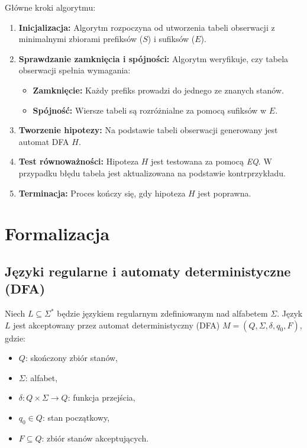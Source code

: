 Główne kroki algorytmu:
\begin{enumerate}
    \item \textbf{Inicjalizacja:} Algorytm rozpoczyna od utworzenia tabeli obserwacji z minimalnymi zbiorami prefiksów (\( S \)) i sufiksów (\( E \)).
    \item \textbf{Sprawdzanie zamknięcia i spójności:} Algorytm weryfikuje, czy tabela obserwacji spełnia wymagania:
    \begin{itemize}
        \item \textbf{Zamknięcie:} Każdy prefiks prowadzi do jednego ze znanych stanów.
        \item \textbf{Spójność:} Wiersze tabeli są rozróżnialne za pomocą sufiksów w \( E \).
    \end{itemize}
    \item \textbf{Tworzenie hipotezy:} Na podstawie tabeli obserwacji generowany jest automat DFA \( H \).
    \item \textbf{Test równoważności:} Hipoteza \( H \) jest testowana za pomocą \textit{EQ}. W przypadku błędu tabela jest aktualizowana na podstawie kontrprzykładu.
    \item \textbf{Terminacja:} Proces kończy się, gdy hipoteza \( H \) jest poprawna.
\end{enumerate}

\section{Formalizacja}

\subsection{Języki regularne i automaty deterministyczne (DFA)}

Niech \( L \subseteq \Sigma^* \) będzie językiem regularnym zdefiniowanym nad alfabetem \( \Sigma \). Język \( L \) jest akceptowany przez automat deterministyczny (DFA) \( M = (Q, \Sigma, \delta, q_0, F) \), gdzie:
\begin{itemize}
    \item \( Q \): skończony zbiór stanów,
    \item \( \Sigma \): alfabet,
    \item \( \delta: Q \times \Sigma \to Q \): funkcja przejścia,
    \item \( q_0 \in Q \): stan początkowy,
    \item \( F \subseteq Q \): zbiór stanów akceptujących.
\end{itemize}

